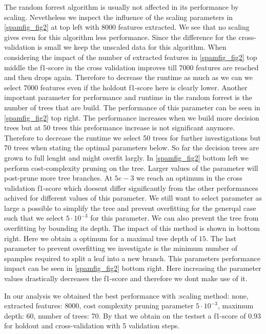 \documentclass[11pt]{article}
\begin{document}
%
The random forrest algorithm is usually not affected in its performance by scaling. Nevetheless we inspect the influence of the scaling parameters in \ref{spamfig_fig2} at top left with 8000 features extracted. We see that no scaling gives even for this algorithm less performance. Since the difference for the cross-validation is small we keep the unscaled data for this algorithm. When considering the impact of the number of extracted features in \ref{spamfig_fig2} top middle the f1-score in the cross validation improves till 7000 features are reached and then drops again. Therefore to decrease the runtime as much as we can we select 7000 features even if the holdout f1-score here is clearly lower. Another important parameter for performance and runtime in the random forrest is the number of trees that are build. The performance of this parameter can be seen in \ref{spamfig_fig2} top right. The performance increases when we build more decision trees but at 50 trees this preformance increase is not significant anymore. Therefore to decrease the runtime we select 50 trees for further investigations but 70 trees when stating the optimal parameters below. So far the decision trees are grown to full lenght and might overfit largly. In \ref{spamfig_fig2} bottom left we perform cost-complexity pruning on the tree. Larger values of the parameter will post-prune more tree branches. At $5e-3$ we reach an optimum in the cross validation f1-score which doesent differ significantly from the other performances achived for different values of this parameter. We still want to select parameter as large a possible to simplify the tree and prevent overfitting for the generqal case such that we select $5\cdot10^{-3}$ for this parameter. We can also prevent the tree from overfitting by bounding its depth. The impact of this method is shown in \label{spamfig_fig2} bottom right. Here we obtain a optimum for a maximal tree depth of $15$. The last parameter to prevent overfitting we investigate is the minimum number of spamples required to split a leaf into a new branch. This parameters performance impact can be seen in \ref{spamfig_fig2} bottom right. Here increasing the parameter values drastically decreases the f1-score and therefore we dont make use of it.

In our analysis we obtained the best performance with :scaling method: none, extracted features: $8000$, cost complexity pruning parameter $5\cdot10^{-3}$, maximum depth: $60$, number of trees: 70. By that we obtain on the testset a f1-score of $0.93$ for holdout and cross-validation with 5 validation steps.
\end{document}
